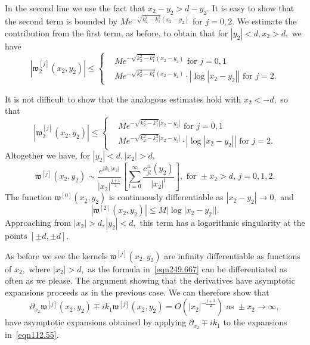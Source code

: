 \documentclass[11pt]{article}
\newcommand{\Bk}{\color{black}}
\newcommand{\Rd}{\color{black}}
\newcommand\fw{\mathfrak w}
\newcommand\pa{\partial}
\theoremstyle{definition}
\theoremstyle{remark}
\begin{document}
     In the second line we use the fact that $x_2-y_2>d-y_2.$ It is easy to show
     that the second term is bounded by $Me^{-\sqrt{k_2^2-k_1^2}(x_2-y_2)}$ for $j=0,2.$
     We estimate the contribution from the first term, as before, to obtain that
     for $|y_2|<d, x_2>d,$ we have
     \begin{equation}
      |\fw^{[j]}_2(x_2,y_2)|\leq 
      \begin{cases}
        &Me^{-\sqrt{k_2^2-k_1^2}(x_2-y_2)}\text{ for }j=0,1\\
        &Me^{-\sqrt{k_2^2-k_1^2}(x_2-y_2)}\cdot\left|\log|x_2-y_2|\right|\text{ for }j=2.
      \end{cases}
     \end{equation}
    

     It is not difficult to show that the analogous estimates hold with
     $x_2<-d,$ so that
   \begin{equation}
      |\fw^{[j]}_2(x_2,y_2)|\leq 
      \begin{cases}
        &Me^{-\sqrt{k_2^2-k_1^2}|x_2-y_2|}\text{ for }j=0,1\\
        &Me^{-\sqrt{k_2^2-k_1^2}|x_2-y_2|}\cdot\left|\log|x_2-y_2|\right|\text{ for }j=2.
      \end{cases}
   \end{equation}
   Altogether we have, for $|y_2|<d,|x_2|>d,$
    \begin{equation}\label{eqn112.55}
      \fw^{[j]}(x_2,y_2)\sim
       \frac{e^{ik_1|x_2|}}{ |x_2|^{\frac{j+1}{2}}}\left[\sum_{l=0}^{\infty}
       \frac{c^{\pm}_{jl}(y_2)}{|x_2|^l}\right],    \text{ for }\pm x_2>d,\, j=0,1,2.
    \end{equation}
        The function $\fw^{[0]}(x_2,y_2)$ is continuously differentiable as
    $|x_2-y_2|\to 0,$ and 
    \begin{equation}
      |\fw^{[2]}(x_2,y_2)|\leq M|\log|x_2-y_2||.
    \end{equation}
Approaching from $|x_2|>d, |y_2|<d,$ this term has a logarithmic singularity at the points $[\pm d,\pm d].$
    
   \Rd As before we see the kernels $\fw^{[j]}(x_2,y_2)$ are infinity
   differentiable as functions of $x_2,$ where $|x_2|>d,$ as the formula
   in~\eqref{eqn249.667} can be differentiated as often as we please. The
   argument showing that the derivatives have asymptotic expansions proceeds as
   in the previous case. \Bk We can therefore show that
   \begin{equation}
     \pa_{x_2}\fw^{[j]}(x_2,y_2)\mp ik_1
     \fw^{[j]}(x_2,y_2)=O\left(|x_2|^{-\frac{j+3}{2}}\right)\text{ as }\pm x_2 \to\infty,
   \end{equation}
   have asymptotic expansions obtained by applying $\pa_{x_2}\mp ik_1$ to the
   expansions in~\eqref{eqn112.55}.
\end{document}
